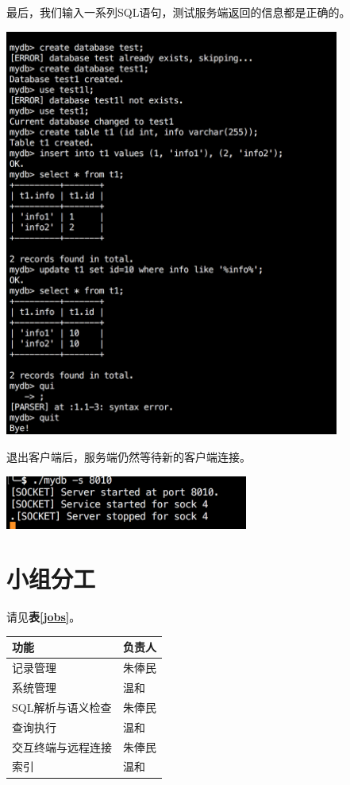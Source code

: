\documentclass[11pt, a4paper]{article}
\makeatletter
\newcommand\fcaption{\def\@captype{figure}\caption}
\newcommand\tcaption{\def\@captype{table}\caption}
\newcommand{\tref}[1]{\textbf{表\ref{#1}}}
\makeatother
\begin{document}
最后，我们输入一系列SQL语句，测试服务端返回的信息都是正确的。

\begin{center}
    \includegraphics[width=11cm]{fig/conn-test}
    \fcaption{远程操作数据库}
\end{center}

退出客户端后，服务端仍然等待新的客户端连接。

\begin{center}
    \includegraphics[width=8cm]{fig/disconn}
    \fcaption{断开连接}
\end{center}

\section{小组分工}

请见\tref{jobs}。

\begin{center}
    \tcaption{小组分工}\label{jobs}
    \begin{tabular}{ll}
        \toprule
        功能 & 负责人 \\
        \midrule
        记录管理 & 朱俸民 \\
        系统管理 & 温和 \\
        SQL解析与语义检查 & 朱俸民 \\
        查询执行 & 温和 \\
        交互终端与远程连接 & 朱俸民 \\
        索引 & 温和 \\
        \bottomrule
    \end{tabular}
\end{center}
\end{document}
